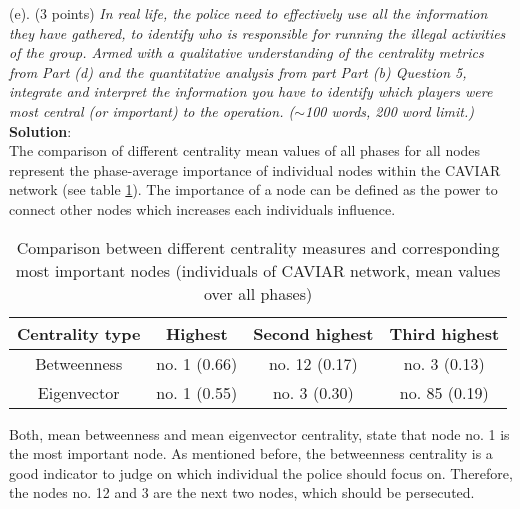 (e). (3 points) \textsl{In real life, the police need to effectively use all the information they have gathered, to identify who is responsible for running the illegal activities of the group. Armed with a qualitative understanding of the centrality metrics from Part (d) and the quantitative analysis from part Part (b) Question 5, integrate and interpret the information you have to identify which players were most central (or important) to the operation. ($\sim$100 words, 200 word limit.)}\\

\textbf{Solution}:\\
The comparison of different centrality mean values of all phases for all nodes represent the phase-average importance of individual nodes within the CAVIAR network (see table \ref{tab:centrality_important_nodes}). The importance of a node can be defined as the power to connect other nodes which increases each individuals influence.\\

\begin{table}[h]
	\centering
	\begin{tabular}{|c|c|c|c|}
		\hline 
		Centrality type & Highest & Second highest & Third highest \\ 
		\hline 
		Betweenness & no. 1 (0.66) & no. 12 (0.17) & no. 3 (0.13) \\ 
		\hline 
		Eigenvector & no. 1 (0.55) & no. 3 (0.30) & no. 85 (0.19)\\ 
		\hline 
	\end{tabular} 
	\caption{Comparison between different centrality measures and corresponding most important nodes (individuals of CAVIAR network, mean values over all phases)}
	\label{tab:centrality_important_nodes}
\end{table}

Both, mean betweenness and mean eigenvector centrality, state that node no. 1 is the most important node. As mentioned before, the betweenness centrality is a good indicator to judge on which individual the police should focus on. Therefore, the nodes no. 12 and 3 are the next two nodes, which should be persecuted.\\